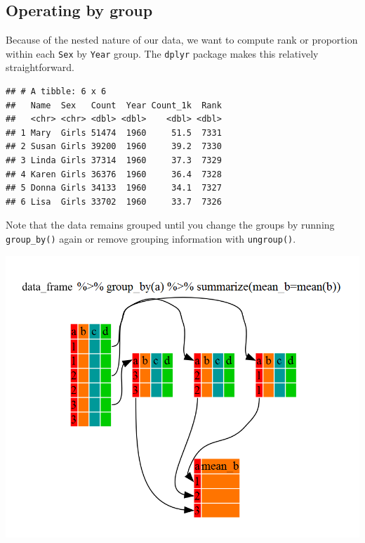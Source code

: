 \documentclass[]{book}
\newenvironment{Shaded}{\begin{snugshade}}{\end{snugshade}}
\newcommand{\DataTypeTok}[1]{\textcolor[rgb]{0.13,0.29,0.53}{#1}}
\newcommand{\KeywordTok}[1]{\textcolor[rgb]{0.13,0.29,0.53}{\textbf{#1}}}
\newcommand{\NormalTok}[1]{#1}
\newcommand{\OperatorTok}[1]{\textcolor[rgb]{0.81,0.36,0.00}{\textbf{#1}}}
\newcommand{\StringTok}[1]{\textcolor[rgb]{0.31,0.60,0.02}{#1}}
\begin{document}
\hypertarget{operating-by-group}{%
\subsection{Operating by group}\label{operating-by-group}}

Because of the nested nature of our data, we want to compute rank
or proportion within each \texttt{Sex} by \texttt{Year} group. The \texttt{dplyr}
package makes this relatively straightforward.

\begin{Shaded}
\end{Shaded}

\begin{verbatim}
## # A tibble: 6 x 6
##   Name  Sex   Count  Year Count_1k  Rank
##   <chr> <chr> <dbl> <dbl>    <dbl> <dbl>
## 1 Mary  Girls 51474  1960     51.5  7331
## 2 Susan Girls 39200  1960     39.2  7330
## 3 Linda Girls 37314  1960     37.3  7329
## 4 Karen Girls 36376  1960     36.4  7328
## 5 Donna Girls 34133  1960     34.1  7327
## 6 Lisa  Girls 33702  1960     33.7  7326
\end{verbatim}

Note that the data remains grouped until you change the groups by
running \texttt{group\_by()} again or remove grouping information with
\texttt{ungroup()}.

\includegraphics{R/Rintro/images/split-apply-combine.png}
\end{document}
